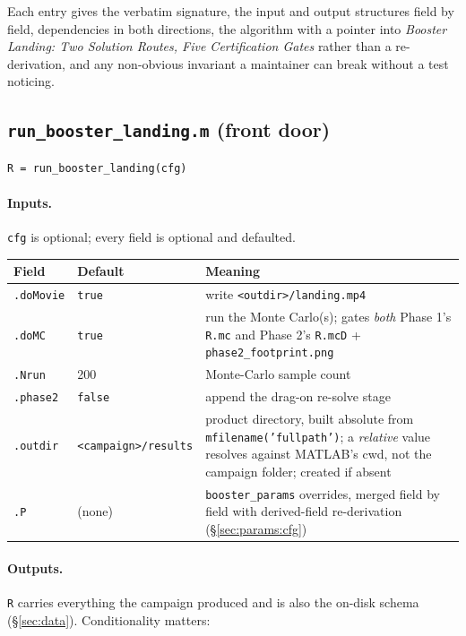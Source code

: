 \documentclass[11pt]{article}
\newcommand{\thenote}{\emph{Booster Landing: Two Solution Routes, Five
Certification Gates}}
\newcommand{\file}[1]{\texttt{#1}}
\begin{document}
Each entry gives the verbatim signature, the input and output structures
field by field, dependencies in both directions, the algorithm with a
pointer into \thenote{} rather than a re-derivation, and any non-obvious
invariant a maintainer can break without a test noticing.

\subsection{\texttt{run\_booster\_landing.m} (front door)}
\label{sec:mod:frontdoor}

\begin{verbatim}
R = run_booster_landing(cfg)
\end{verbatim}

\paragraph{Inputs.} \texttt{cfg} is optional; every field is optional and
defaulted.

\begin{center}
\begin{tabular}{@{}llL{7.2cm}@{}}
\toprule
Field & Default & Meaning \\
\midrule
\texttt{.doMovie} & \texttt{true} & write \texttt{<outdir>/landing.mp4} \\
\texttt{.doMC}    & \texttt{true} & run the Monte Carlo(s); gates
  \emph{both} Phase 1's \texttt{R.mc} and Phase 2's \texttt{R.mcD} +
  \texttt{phase2\_footprint.png} \\
\texttt{.Nrun}    & \num{200} & Monte-Carlo sample count \\
\texttt{.phase2}  & \texttt{false} & append the drag-on re-solve stage \\
\texttt{.outdir}  & \file{<campaign>/results} & product directory, built
  absolute from \texttt{mfilename('fullpath')}; a \emph{relative} value
  resolves against MATLAB's cwd, not the campaign folder; created if absent \\
\texttt{.P}       & (none) & \texttt{booster\_params} overrides, merged
  field by field with derived-field re-derivation (\S\ref{sec:params:cfg}) \\
\bottomrule
\end{tabular}
\end{center}

\paragraph{Outputs.} \texttt{R} carries everything the campaign produced and
is also the on-disk schema (\S\ref{sec:data}). Conditionality matters:
\end{document}
